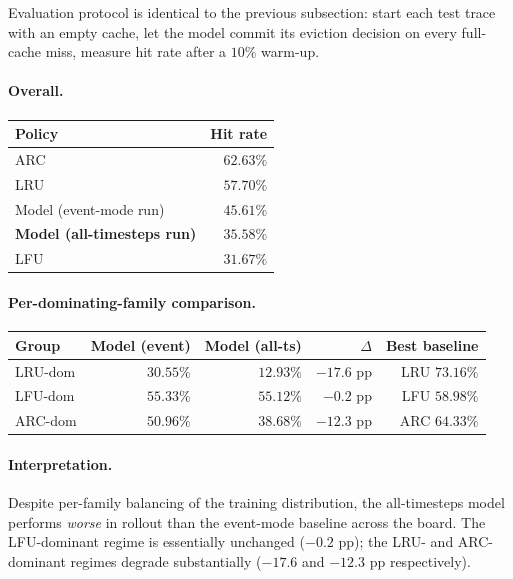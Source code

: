 \documentclass{article}
\begin{document}
Evaluation protocol is identical to the previous subsection: start each test
trace with an empty cache, let the model commit its eviction decision on
every full-cache miss, measure hit rate after a $10\%$ warm-up.

\paragraph{Overall.}

\begin{center}
\begin{tabular}{lr}
\toprule
Policy & Hit rate \\
\midrule
ARC                      & $62.63\%$ \\
LRU                      & $57.70\%$ \\
Model (event-mode run)   & $45.61\%$ \\
\textbf{Model (all-timesteps run)} & $\mathbf{35.58\%}$ \\
LFU                      & $31.67\%$ \\
\bottomrule
\end{tabular}
\end{center}

\paragraph{Per-dominating-family comparison.}

\begin{center}
\begin{tabular}{lrrrr}
\toprule
Group & Model (event) & Model (all-ts) & $\Delta$ & Best baseline \\
\midrule
LRU-dom & $30.55\%$ & $12.93\%$ & $-17.6$ pp & LRU $73.16\%$ \\
LFU-dom & $55.33\%$ & $55.12\%$ & $-0.2$ pp  & LFU $58.98\%$ \\
ARC-dom & $50.96\%$ & $38.68\%$ & $-12.3$ pp & ARC $64.33\%$ \\
\bottomrule
\end{tabular}
\end{center}

\paragraph{Interpretation.}

Despite per-family balancing of the training distribution, the
all-timesteps model performs \emph{worse} in rollout than the event-mode
baseline across the board. The LFU-dominant regime is essentially unchanged
($-0.2$ pp); the LRU- and ARC-dominant regimes degrade substantially ($-17.6$
and $-12.3$ pp respectively).
\end{document}
